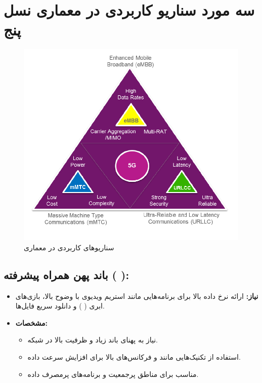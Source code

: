 \documentclass[landscape, 12pt]{report}
\begin{document}
\chapter*{سه مورد سناریو کاربردی در معماری نسل پنج}
\begin{figure}[ht]
	\centering
	\includegraphics[width=.6\linewidth]{Pic/5G_3Scenarios}
	\caption{سناریوهای کاربردی در معماری
	}
	\label{fig:5G_3Scenarios}
\end{figure}
 \section*{
 	باند پهن همراه پیشرفته (
 	):}
 	\begin{itemize}
 		\item \textbf{نیاز:}
ارائه نرخ داده بالا برای برنامه‌هایی مانند استریم ویدیوی با وضوح بالا، بازی‌های ابری (
) و دانلود سریع فایل‌ها.
 		\item \textbf{مشخصات:}
 		\begin{itemize}
 			\item 
 نیاز به پهنای باند زیاد و ظرفیت بالا در شبکه.
 			\item 
استفاده از تکنیک‌هایی مانند
 و فرکانس‌های بالا برای افزایش سرعت داده.
 			\item 
 مناسب برای مناطق پرجمعیت و برنامه‌های پرمصرف داده.
 		\end{itemize}
 	\end{itemize}
 	
\end{document}
